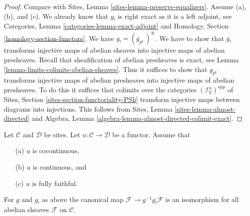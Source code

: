 \begin{proof}
Compare with
Sites, Lemma \ref{sites-lemma-preserve-equalizers}.
Assume (a), (b), and (c).
We already know that $g_!$ is right exact as it is a left adjoint, see
Categories, Lemma \ref{categories-lemma-exact-adjoint} and
Homology, Section \ref{homology-section-functors}.
We have $g_! = (g_{p!}\ )^\#$. We have to show that
$g_!$ transforms injective maps of abelian sheaves into injective maps
of abelian presheaves.
Recall that sheafification of abelian presheaves is exact, see
Lemma \ref{lemma-limits-colimits-abelian-sheaves}.
Thus it suffices to show that $g_{p!}$ transforms injective maps of
abelian presheaves into injective maps of abelian presheaves.
To do this it suffices that colimits over the categories
$(\mathcal{I}_V^u)^{opp}$ of
Sites, Section \ref{sites-section-functoriality-PSh}
transform injective maps between diagrams into injections.
This follows from
Sites, Lemma \ref{sites-lemma-almost-directed}
and
Algebra, Lemma \ref{algebra-lemma-almost-directed-colimit-exact}.
\end{proof}

\begin{lemma}
\label{lemma-back-and-forth}
Let $\mathcal{C}$ and $\mathcal{D}$ be sites.
Let $u : \mathcal{C} \to \mathcal{D}$ be a functor.
Assume that
\begin{enumerate}
\item[(a)] $u$ is cocontinuous,
\item[(b)] $u$ is continuous, and
\item[(c)] $u$ is fully faithful.
\end{enumerate}
For $g$ and $g_!$ as above the canonical map
$\mathcal{F} \to g^{-1}g_!\mathcal{F}$ is an isomorphism
for all abelian sheaves $\mathcal{F}$ on $\mathcal{C}$.
\end{lemma}

